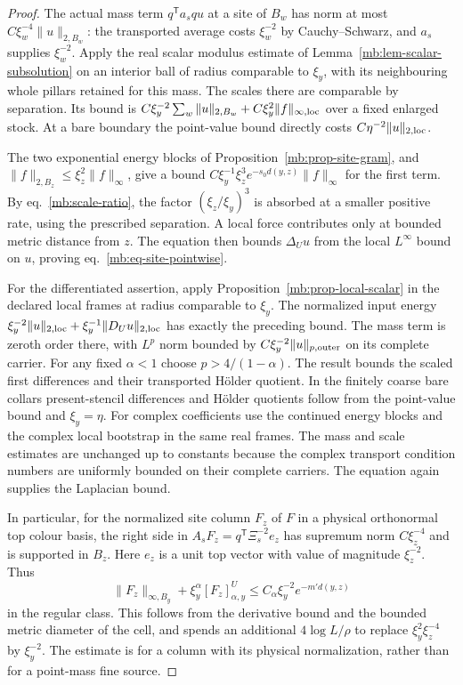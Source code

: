 \documentclass[11pt,letterpaper,reqno]{amsart}
\numberwithin{equation}{section}
\renewcommand{\eqref}[1]{\textup{eq.~\ref{#1}}}
\theoremstyle{definition}
\theoremstyle{remark}
\begin{document}
\begin{proof}
The actual mass term \(q^{\mathsf T}a_s q u\) at a site of
\(B_w\) has norm at most \(C\xi_w^{-4}\|u\|_{2,B_w}\):
the transported average costs \(\xi_w^{-2}\) by
Cauchy--Schwarz, and \(a_s\) supplies \(\xi_w^{-2}\).
Apply the real scalar modulus estimate of
Lemma~\ref{mb:lem-scalar-subsolution} on an interior ball
of radius comparable to \(\xi_y\), with its neighbouring
whole pillars retained for this mass. The scales there
are comparable by separation. Its bound is
\(C\xi_y^{-2}\sum_w\|u\|_{2,B_w}
  +C\xi_y^2\|f\|_{\infty,\rm loc}\) over a fixed enlarged stock.
At a bare boundary the point-value bound directly costs
\(C\eta^{-2}\|u\|_{2,\rm loc}\).

The two exponential energy blocks of
Proposition~\ref{mb:prop-site-gram}, and
\(\|f\|_{2,B_z}\le \xi_z^2\|f\|_\infty\), give a bound
\(C\xi_y^{-1}\xi_z^3 e^{-s_0 d(y,z)}\|f\|_\infty\)
for the first term. By \eqref{mb:scale-ratio}, the
factor \((\xi_z/\xi_y)^3\) is absorbed at a smaller
positive rate, using the prescribed separation.
A local force contributes only at bounded metric distance
from \(z\). The equation then bounds \(\Delta_Uu\)
from the local \(L^\infty\) bound on \(u\), proving
\eqref{mb:eq-site-pointwise}.

For the differentiated assertion, apply
Proposition~\ref{mb:prop-local-scalar} in the declared
local frames at radius comparable to \(\xi_y\).
The normalized input energy
\(\xi_y^{-2}\|u\|_{2,\rm loc}+\xi_y^{-1}\|D_Uu\|_{2,\rm loc}\)
has exactly the preceding bound. The mass term is
zeroth order there, with \(L^p\) norm bounded by
\(C\xi_y^{-2}\|u\|_{p,\rm outer}\) on its complete
carrier. For any fixed \(\alpha<1\) choose
\(p>4/(1-\alpha)\). The result bounds the scaled first
differences and their transported H\"older quotient.
In the finitely coarse bare collars present-stencil
differences and H\"older quotients follow from the
point-value bound and \(\xi_y=\eta\).
For complex coefficients use the continued energy blocks
and the complex local bootstrap in the same real frames.
The mass and scale estimates are unchanged up to constants
because the complex transport condition numbers are
uniformly bounded on their complete carriers.
The equation again supplies the Laplacian bound.

In particular, for the normalized site column \(F_z\)
of \(F\) in a physical orthonormal top colour basis,
the right side in \(A_s F_z=q^{\mathsf T}\Xi_s^{-2}e_z\)
has supremum norm \(C\xi_z^{-4}\) and is supported in
\(B_z\). Here \(e_z\) is a unit top vector with value
of magnitude \(\xi_z^{-2}\). Thus
\[
 \|F_z\|_{\infty,B_y}+\xi_y^\alpha[F_z]_{\alpha,y}^{U}
                      \le C_\alpha \xi_y^{-2}e^{-m' d(y,z)}
\]
in the regular class. This follows from the derivative
bound and the bounded metric diameter of the cell,
and spends an additional \(4\log L/\rho\) to replace
\(\xi_y^2\xi_z^{-4}\) by \(\xi_y^{-2}\).
The estimate is for a column with its physical
normalization, rather than for a point-mass fine source.
\end{proof}
\end{document}
